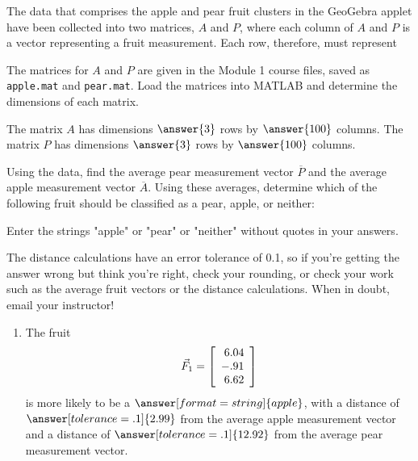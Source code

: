 \documentclass{ximera}
\author{Zack Reed}
\begin{document}
\begin{exercise}

The data that comprises the apple and pear fruit clusters in the GeoGebra applet have been collected into two matrices, $A$ and $P$, where each column of $A$ and $P$ is a vector representing a fruit measurement. Each row, therefore, must represent

\begin{multipleChoice}
\end{multipleChoice}

The matrices for $A$ and $P$ are given in the Module 1 course files, saved as \texttt{apple.mat} and \texttt{pear.mat}. Load the matrices into MATLAB and determine the dimensions of each matrix.

The matrix $A$ has dimensions $\answer{3}$ rows by $\answer{100}$ columns. The matrix $P$ has dimensions $\answer{3}$ rows by $\answer{100}$ columns.

Using the data, find the average pear measurement vector $\overline{P}$ and the average apple measurement vector $\overline{A}$. Using these averages, determine which of the following fruit should be classified as a pear, apple, or neither:

\begin{hint}
  Enter the strings "apple" or "pear" or "neither" without quotes in your answers.
  
  The distance calculations have an error tolerance of 0.1, so if you're getting the answer wrong but think you're right, check your rounding, or check your work such as the average fruit vectors or the distance calculations. When in doubt, email your instructor!
\end{hint}

\begin{enumerate}
\item
The fruit
\begin{equation*}
  \vec{F}_1=\startmat{r}
    6.04 \\
    -.91 \\
    6.62
  \stopmat
\end{equation*}
is more likely to be a $\answer[format=string]{apple}$, with a distance of $\answer[tolerance=.1]{2.99}$ from the average apple measurement vector and a distance of $\answer[tolerance=.1]{12.92}$ from the average pear measurement vector.


\end{enumerate}
\end{exercise}
\end{document}
